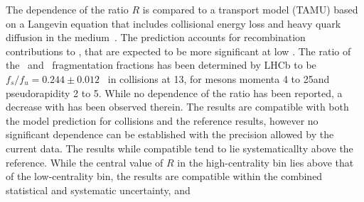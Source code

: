  The \pt dependence of the ratio $R$ is compared to 
 a transport model (TAMU) based on a Langevin equation that includes collisional energy loss and heavy quark diffusion in the medium~\cite{tamu14}.
 The prediction accounts for recombination contributions to \PBzs, that are expected to be more significant at low \pt. 
%
%
The ratio of the \PBzs\ and \PBp\ fragmentation fractions has been determined by LHCb to be  $f_s/f_u =0.244\pm0.012$~\cite{fsfulhcb2019} in  \pp collisions at 13\TeV, for \PB mesons momenta 4 to 25\GeVc and pseudorapidity 2 to 5. While no dependence of the ratio has been reported, a decrease with \pt has been observed therein. 
The results are compatible with both the model prediction for \PbPb collisions and the \pp reference results, however no significant \pt dependence can be established with the precision allowed by the current data. 
%
%
The results %
while compatible tend to lie systematicallty above the \TeV reference. 
While the central value of $R$ in the high-centrality bin lies above that of the low-centrality bin, the results are compatible within the combined statistical and systematic uncertainty, and      
